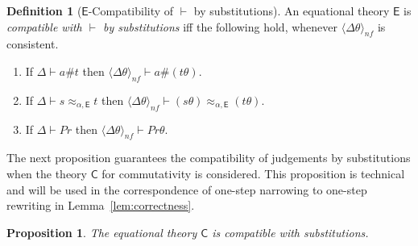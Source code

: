 \documentclass[11pt,a4paper]{amsart}
\newcommand{\daniele}[1]{\textcolor{cyan}{#1}}
\newcommand{\caleq}{\approx_{\alpha,\theory{C}}}
\newcommand{\ealeq}{\approx_{\alpha,\theory{E}}}
\newcommand{\pair}[1]{\langle #1\rangle}
\newcommand{\theory}[1]{\ensuremath{\mathsf{#1}}}
\theoremstyle{plain}
\newtheorem{proposition}[theorem]{Proposition}
\theoremstyle{definition}
\newtheorem{definition}[theorem]{Definition}
\theoremstyle{remark}
\begin{document}
 
\begin{definition}[\theory{E}-Compatibility of $\vdash$ by substitutions]\label{def:e-compatible}
    An equational theory \theory{E} is {\em compatible with $\vdash$ by substitutions} iff the following hold, whenever $\pair{\Delta\theta}_{nf}$ is consistent. 

    \begin{enumerate}
    \item If $\Delta \vdash a\# t$ then $\pair{\Delta\theta}_{nf} \vdash a\# (t\theta)$. 
    \item If $\Delta \vdash s \ealeq t$ then $\pair{\Delta\theta}_{nf} \vdash (s\theta) \ealeq (t\theta) $.
    \item If $\Delta \vdash Pr$ then $\pair{\Delta\theta}_{nf} \vdash Pr\theta$.
\end{enumerate}
\end{definition}


The next proposition guarantees the compatibility of judgements by substitutions when the theory \theory{C} for commutativity is considered. This proposition is technical and will be used in the correspondence of one-step narrowing to one-step rewriting in Lemma~\ref{lem:correctness}.




\begin{proposition}
\label{lem:nf-subst}
The equational theory \theory{C} is compatible with substitutions.
\end{proposition}
\end{document}
